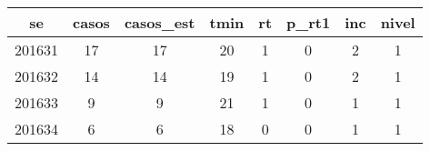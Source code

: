 \begin{tabular}{c|ccccccc}
  \hline
se & casos & casos\_est & tmin & rt & p\_rt1 & inc & nivel \\ 
  \hline
201631 & 17 & 17 & 20 & 1 & 0 & 2 & 1 \\ 
  201632 & 14 & 14 & 19 & 1 & 0 & 2 & 1 \\ 
  201633 & 9 & 9 & 21 & 1 & 0 & 1 & 1 \\ 
  201634 & 6 & 6 & 18 & 0 & 0 & 1 & 1 \\ 
   \hline
\end{tabular}

